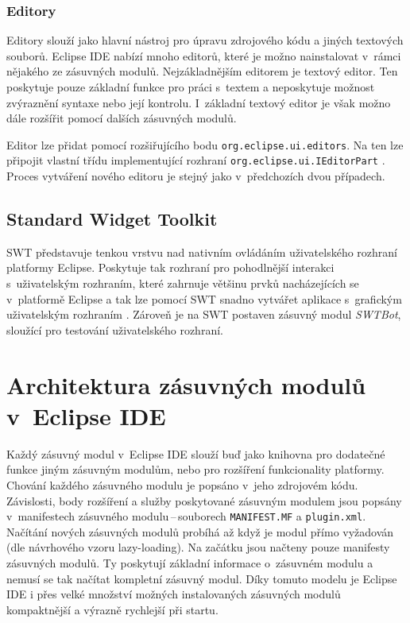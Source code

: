       \subsubsection{Editory}
      Editory slouží jako hlavní nástroj pro úpravu zdrojového kódu a jiných textových souborů. Eclipse IDE nabízí mnoho editorů, které je možno nainstalovat v~rámci nějakého ze zásuvných modulů. Nejzákladnějším editorem je textový editor. Ten poskytuje pouze základní funkce pro práci s~textem a neposkytuje možnost zvýraznění syntaxe nebo její kontrolu. I~základní textový editor je však možno dále rozšířit pomocí dalších zásuvných modulů.

      Editor lze přidat pomocí rozšiřujícího bodu \texttt{org.eclipse.ui.editors}. Na ten lze připojit vlastní třídu implementující rozhraní \texttt{org.eclipse.ui.IEditorPart} \cite{Plugins}. Proces vytváření nového editoru je stejný jako v~předchozích dvou případech.

      \subsection{Standard Widget Toolkit}
      SWT představuje tenkou vrstvu nad nativním ovládáním uživatelského rozhraní platformy Eclipse. Poskytuje tak rozhraní pro pohodlnější interakci s~uživatelským rozhraním, které zahrnuje většinu prvků nacházejících se v~platformě Eclipse a tak lze pomocí SWT snadno vytvářet aplikace s~grafickým uživatelským rozhraním \cite{Plugins}. Zároveň je na SWT postaven zásuvný modul \emph{SWTBot}, sloužící pro testování uživatelského rozhraní.

  \section{Architektura zásuvných modulů v~Eclipse IDE}
  Každý zásuvný modul v~Eclipse IDE slouží buď jako knihovna pro dodatečné funkce jiným zásuvným modulům, nebo pro rozšíření funkcionality platformy. Chování každého zásuvného modulu je popsáno v~jeho zdrojovém kódu. Závislosti, body rozšíření a služby poskytované  zásuvným modulem jsou popsány v~manifestech zásuvného modulu\,--\,souborech \texttt{MANIFEST.MF} a \texttt{plugin.xml}. Načítání nových zásuvných modulů probíhá až když je modul přímo vyžadován\,(dle návrhového vzoru lazy-loading). Na začátku jsou načteny pouze manifesty zásuvných modulů. Ty poskytují základní informace o~zásuvném modulu a nemusí se tak načítat kompletní zásuvný modul. Díky tomuto modelu je Eclipse IDE i přes velké množství možných instalovaných zásuvných modulů kompaktnější a výrazně rychlejší při startu.

